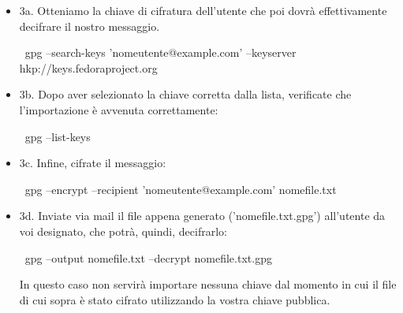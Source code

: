 \begin{itemize}
 \item 3a. Otteniamo la chiave di cifratura dell'utente che poi dovrà effettivamente decifrare il nostro messaggio.\\
\begin{shaded}
{\color[cmyk]{0, 0, 0, 0}\textdollar\ gpg --search-keys 'nomeutente@example.com' --keyserver hkp://keys.fedoraproject.org} \\
\end{shaded}
\item 3b. Dopo aver selezionato la chiave corretta dalla lista, verificate che l'importazione è avvenuta correttamente:\\
\begin{shaded}
{\color[cmyk]{0, 0, 0, 0}\textdollar\ gpg --list-keys}
\end{shaded}
\item 3c. Infine, cifrate il messaggio:\\
\begin{shaded}
{\color[cmyk]{0, 0, 0, 0}\textdollar\ gpg --encrypt --recipient 'nomeutente@example.com' nomefile.txt}\\
\end{shaded}
\item 3d. Inviate via mail il file appena generato ('nomefile.txt.gpg') all'utente da voi designato, che potrà, quindi, decifrarlo:\\
\begin{shaded}
{\color[cmyk]{0, 0, 0, 0}\textdollar\ gpg --output nomefile.txt --decrypt nomefile.txt.gpg}
\end{shaded}
In questo caso non servirà importare nessuna chiave dal momento in cui il file di cui sopra è stato cifrato utilizzando la vostra chiave pubblica.\\
\end{itemize}

